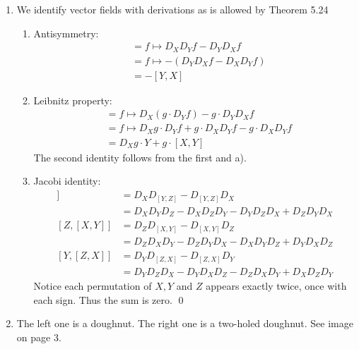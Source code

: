 \documentclass[a4paper,11pt,notitlepage,fullpage]{article}
\begin{document}
\begin{enumerate}
\item We identify vector fields with derivations as is allowed by Theorem 5.24
\begin{enumerate}
\item Antisymmetry:
\begin{align*}
[X, Y] &= f \mapsto D_X D_Y f - D_Y D_X f \\
&= f \mapsto - (D_Y D_X f - D_X D_Y f) \\
&= - [Y, X]
\end{align*}
\item Leibnitz property:
\begin{align*}
[X, gY] &= f \mapsto D_X (g \cdot D_Y f) - g \cdot D_Y D_X f \\
&= f \mapsto D_X g \cdot D_Y f + g \cdot D_X D_Y f - g \cdot D_X D_Y f \\
&= D_X g \cdot Y + g \cdot [X, Y]
\end{align*}
The second identity follows from the first and a).
\item Jacobi identity:
\begin{align*}
[X, [Y, Z]] &= D_X D_{[Y, Z]} - D_{[Y, Z]} D_X \\
&= D_X D_Y D_Z - D_X D_Z D_Y - D_Y D_Z D_X + D_Z D_Y D_X \\
[Z, [X, Y]] &= D_Z D_{[X, Y]} - D_{[X, Y]} D_Z \\
&= D_Z D_X D_Y - D_Z D_Y D_X - D_X D_Y D_Z + D_Y D_X D_Z \\
[Y, [Z, X]] &= D_Y D_{[Z, X]} - D_{[Z, X]} D_Y \\
&= D_Y D_Z D_X - D_Y D_X D_Z - D_Z D_X D_Y + D_X D_Z D_Y 
\end{align*}
Notice each permutation of $X, Y$ and $Z$ appears exactly twice, once with each sign. Thus the sum is zero. \qed
\end{enumerate}


\item The left one is a doughnut. The right one is a two-holed doughnut. See image on page 3.


\end{enumerate}
\end{document}
